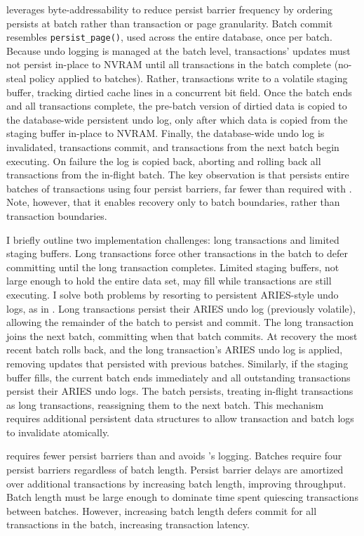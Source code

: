 \GroupCommit leverages byte-addressability to reduce persist barrier frequen\-cy by ordering persists at batch rather than transaction or page granularity.
Batch commit resembles \texttt{persist\_page()}, used across the entire data\-base, once per batch.
Because undo logging is managed at the batch level, transactions' updates must not persist in-place to NVRAM until all transactions in the batch complete (no-steal policy applied to batches).
Rather, transactions write to a volatile staging buffer, tracking dirtied cache lines in a concurrent bit field.
Once the batch ends and all transactions complete, the pre-batch version of dirtied data is copied to the database-wide persistent undo log, only after which data is copied from the staging buffer in-place to NVRAM.
Finally, the database-wide undo log is invalidated, transactions commit, and transactions from the next batch begin executing.
On failure the log is copied back, aborting and rolling back all transactions from the in-flight batch.
The key observation is that \GroupCommit persists entire batches of transactions using four persist barriers, far fewer than required with \InPlace.
Note, however, that it enables recovery only to batch boundaries, rather than transaction boundaries.

I briefly outline two implementation challenges: long transactions and limited staging buffers.
Long transactions force other transactions in the batch to defer committing until the long transaction completes.
Limited staging buffers, not large enough to hold the entire data set, may fill while transactions are still executing.
I solve both problems by resorting to persistent ARIES-style undo logs, as in \InPlace.
Long transactions persist their ARIES undo log (previously volatile), allowing the remainder of the batch to persist and commit.
The long transaction joins the next batch, committing when that batch commits.
At recovery the most recent batch rolls back, and the long transaction's ARIES undo log is applied, removing updates that persisted with previous batches.
Similarly, if the staging buffer fills, the current batch ends immediately and all outstanding transactions persist their ARIES undo logs.
The batch persists, treating in-flight transactions as long transactions, reassigning them to the next batch.
This mechanism requires additional persistent data structures to allow transaction and batch logs to invalidate atomically.

\GroupCommit requires fewer persist barriers than \InPlace and avoids \NVDisk's logging.
Batches require four persist barriers regardless of batch length.
Persist barrier delays are amortized over additional transactions by increasing batch length, improving throughput.
Batch length must be large enough to dominate time spent quiescing transactions between batches.
However, increasing batch length defers commit for all transactions in the batch, increasing transaction latency.

